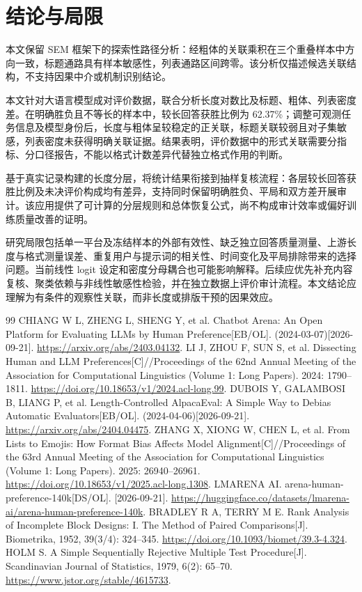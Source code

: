 \documentclass[UTF8,11pt,a4paper,fontset=windows]{ctexart}
\numberwithin{equation}{section}
\begin{document}
\section{结论与局限}
本文保留 SEM 框架下的探索性路径分析：经粗体的关联乘积在三个重叠样本中方向一致，标题通路具有样本敏感性，列表通路区间跨零。该分析仅描述候选关联结构，不支持因果中介或机制识别结论。

本文针对大语言模型成对评价数据，联合分析长度对数比及标题、粗体、列表密度差。在明确胜负且不等长的样本中，较长回答获胜比例为 62.37\%；调整可观测任务信息及模型身份后，长度与粗体呈较稳定的正关联，标题关联较弱且对子集敏感，列表密度未获得明确关联证据。结果表明，评价数据中的形式关联需要分指标、分口径报告，不能以格式计数差异代替独立格式作用的判断。

基于真实记录构建的长度分层，将统计结果衔接到抽样复核流程：各层较长回答获胜比例及未决评价构成均有差异，支持同时保留明确胜负、平局和双方差开展审计。该应用提供了可计算的分层规则和总体恢复公式，尚不构成审计效率或偏好训练质量改善的证明。

研究局限包括单一平台及冻结样本的外部有效性、缺乏独立回答质量测量、上游长度与格式测量误差、重复用户与提示词的相关性、时间变化及平局排除带来的选择问题。当前线性 logit 设定和密度分母耦合也可能影响解释。后续应优先补充内容复核、聚类依赖与非线性敏感性检验，并在独立数据上评价审计流程。本文结论应理解为有条件的观察性关联，而非长度或排版干预的因果效应。

\FloatBarrier
\begin{thebibliography}{99}\small
{} CHIANG W L, ZHENG L, SHENG Y, et al. Chatbot Arena: An Open Platform for Evaluating LLMs by Human Preference[EB/OL]. (2024-03-07)[2026-09-21]. \url{https://arxiv.org/abs/2403.04132}.
 LI J, ZHOU F, SUN S, et al. Dissecting Human and LLM Preferences[C]//Proceedings of the 62nd Annual Meeting of the Association for Computational Linguistics (Volume 1: Long Papers). 2024: 1790--1811. \url{https://doi.org/10.18653/v1/2024.acl-long.99}.
 DUBOIS Y, GALAMBOSI B, LIANG P, et al. Length-Controlled AlpacaEval: A Simple Way to Debias Automatic Evaluators[EB/OL]. (2024-04-06)[2026-09-21]. \url{https://arxiv.org/abs/2404.04475}.
 ZHANG X, XIONG W, CHEN L, et al. From Lists to Emojis: How Format Bias Affects Model Alignment[C]//Proceedings of the 63rd Annual Meeting of the Association for Computational Linguistics (Volume 1: Long Papers). 2025: 26940--26961. \url{https://doi.org/10.18653/v1/2025.acl-long.1308}.
 LMARENA AI. arena-human-preference-140k[DS/OL]. [2026-09-21]. \url{https://huggingface.co/datasets/lmarena-ai/arena-human-preference-140k}.
 BRADLEY R A, TERRY M E. Rank Analysis of Incomplete Block Designs: I. The Method of Paired Comparisons[J]. Biometrika, 1952, 39(3/4): 324--345. \url{https://doi.org/10.1093/biomet/39.3-4.324}.
 HOLM S. A Simple Sequentially Rejective Multiple Test Procedure[J]. Scandinavian Journal of Statistics, 1979, 6(2): 65--70. \url{https://www.jstor.org/stable/4615733}.
\end{thebibliography}
\end{document}
